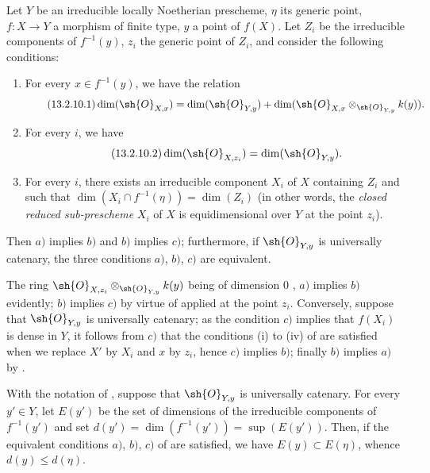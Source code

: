 \begin{proposition}[13.2.10]
\label{IV.13.2.10}
Let $Y$ be an irreducible locally Noetherian prescheme, $\eta$ its generic point, $f:X\to Y$ a morphism of finite type, $y$ a point of $f(X)$.
Let $Z_i$ be the
irreducible components of $f^{-1}(y)$, $z_i$ the generic point of $Z_i$, and consider the following conditions:
\begin{enumerate}[label=\emph{\alph*)}]
  \item For every $x\in f^{-1}(y)$, we have the relation
  \[
  \tag{13.2.10.1}
\label{IV.13.2.10.1}
    \dim(\sh{O}_{X,x})=\dim(\sh{O}_{Y,y})+\dim(\sh{O}_{X,x}\otimes_{\sh{O}_{Y,y}}k(y)).
  \]
  \item For every $i$, we have
  \[
  \label{IV.13.2.10.2}
\tag{13.2.10.2}
    \dim(\sh{O}_{X,z_i})=\dim(\sh{O}_{Y,y}).
  \]
  \item For every $i$, there exists an irreducible component $X_i$ of $X$ containing $Z_i$ and such that $\dim(X_i\cap f^{-1}(\eta))=\dim(Z_i)$ (in other words, the \emph{closed reduced sub-prescheme} $X_i$ of $X$ is equidimensional over $Y$ at the point $z_i$).
\end{enumerate}
Then $a)$ implies $b)$ and $b)$ implies $c)$; furthermore, if $\sh{O}_{Y,y}$ is universally catenary, the three conditions $a)$, $b)$, $c)$ are equivalent.
\end{proposition}

The ring $\sh{O}_{X,z_i}\otimes_{\sh{O}_{Y,y}}k(y)$ being of dimension $0$ , $a)$ implies $b)$ evidently; $b)$ implies $c)$ by virtue of  applied at the point $z_i$.
Conversely, suppose that $\sh{O}_{Y,y}$ is universally catenary; as the condition $c)$ implies that $f(X_i)$ is dense in $Y$, it follows from $c)$ that the conditions (i) to (iv) of  are satisfied when we replace $X'$ by $X_i$ and $x$ by $z_i$, hence $c)$ implies $b)$; finally $b)$ implies $a)$ by .

\begin{corollary}[13.2.11]
\label{IV.13.2.11}
With the notation of , suppose that $\sh{O}_{Y,y}$ is universally catenary.
For every $y'\in Y$, let $E(y')$ be the set of dimensions of the irreducible components of $f^{-1}(y')$ and set $d(y')=\dim(f^{-1}(y'))=\sup(E(y'))$.
Then, if the equivalent conditions $a)$, $b)$, $c)$ of  are satisfied, we have $E(y)\subset E(\eta)$, whence $d(y)\leq d(\eta)$.
\end{corollary}

